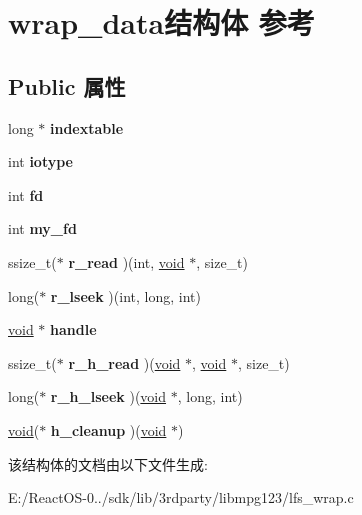 \hypertarget{structwrap__data}{}\section{wrap\+\_\+data结构体 参考}
\label{structwrap__data}
\subsection*{Public 属性}
\begin{DoxyCompactItemize}
\item 
\mbox{\label{structwrap__data_a1abc4ac10fbf1071ca0c3a9a4444f584}} 
long $\ast$ {\bfseries indextable}
\item 
\mbox{\label{structwrap__data_ad4a1d3a557646655824198fccc6265f4}} 
int {\bfseries iotype}
\item 
\mbox{\label{structwrap__data_a6bfc621a7bd45dbcac0e80e85d5f2a80}} 
int {\bfseries fd}
\item 
\mbox{\label{structwrap__data_aec3921edc63ee7f77c9b6bc689126439}} 
int {\bfseries my\+\_\+fd}
\item 
\mbox{\label{structwrap__data_a69927954fe600d92616f9a661017f356}} 
ssize\+\_\+t($\ast$ {\bfseries r\+\_\+read} )(int, \hyperlink{interfacevoid}{void} $\ast$, size\+\_\+t)
\item 
\mbox{\label{structwrap__data_a98ac8a9963ce77d247b8628b4ab5cb43}} 
long($\ast$ {\bfseries r\+\_\+lseek} )(int, long, int)
\item 
\mbox{\label{structwrap__data_adfa1ed8089a1f0a7e4ead680501998a3}} 
\hyperlink{interfacevoid}{void} $\ast$ {\bfseries handle}
\item 
\mbox{\label{structwrap__data_a2301d3913a1e3ac1696d3299f1e03717}} 
ssize\+\_\+t($\ast$ {\bfseries r\+\_\+h\+\_\+read} )(\hyperlink{interfacevoid}{void} $\ast$, \hyperlink{interfacevoid}{void} $\ast$, size\+\_\+t)
\item 
\mbox{\label{structwrap__data_a143e2408e5f03329951e40edb2ff73df}} 
long($\ast$ {\bfseries r\+\_\+h\+\_\+lseek} )(\hyperlink{interfacevoid}{void} $\ast$, long, int)
\item 
\mbox{\label{structwrap__data_ac35a182bf2336f33acf841aa854fdcce}} 
\hyperlink{interfacevoid}{void}($\ast$ {\bfseries h\+\_\+cleanup} )(\hyperlink{interfacevoid}{void} $\ast$)
\end{DoxyCompactItemize}


该结构体的文档由以下文件生成\+:\begin{DoxyCompactItemize}
\item 
E\+:/\+React\+O\+S-\/0../sdk/lib/3rdparty/libmpg123/lfs\+\_\+wrap.\+c\end{DoxyCompactItemize}
